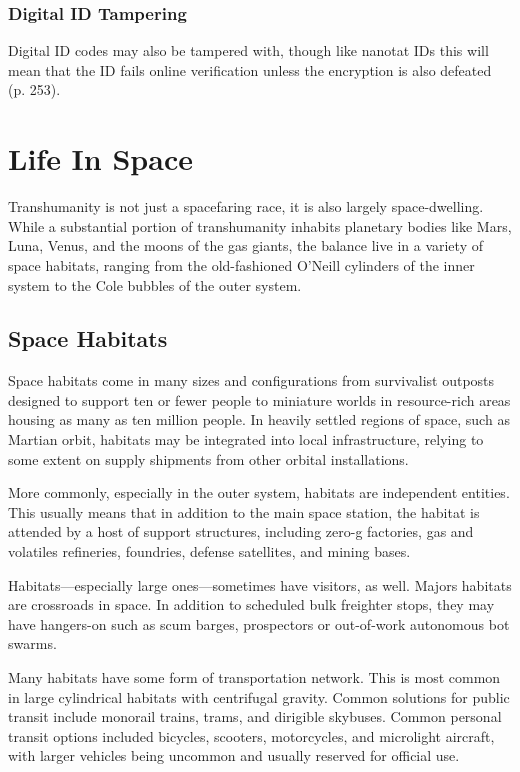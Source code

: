 \subsubsection{Digital ID Tampering}

Digital ID codes may also be tampered with, though like 
nanotat IDs this will mean that the ID fails online verification
unless the encryption is also defeated (p. 253).

\section{Life In Space}

Transhumanity is not just a spacefaring race, it is 
also largely space-dwelling. While a substantial portion
of transhumanity inhabits planetary bodies like
Mars, Luna, Venus, and the moons of the gas giants, 
the balance live in a variety of space habitats, ranging 
from the old-fashioned O'Neill cylinders of the inner 
system to the Cole bubbles of the outer system.

\subsection{Space Habitats}

Space habitats come in many sizes and configurations
from survivalist outposts designed to support
ten or fewer people to miniature worlds in resource-rich
areas housing as many as ten million people. In
heavily settled regions of space, such as Martian orbit, 
habitats may be integrated into local infrastructure, 
relying to some extent on supply shipments from other 
orbital installations.

More commonly, especially in the outer system, 
habitats are independent entities. This usually means 
that in addition to the main space station, the habitat 
is attended by a host of support structures, including 
zero-g factories, gas and volatiles refineries, foundries, 
defense satellites, and mining bases.

Habitats—especially large ones—sometimes have 
visitors, as well. Majors habitats are crossroads in 
space. In addition to scheduled bulk freighter stops, 
they may have hangers-on such as scum barges, prospectors
or out-of-work autonomous bot swarms.

Many habitats have some form of transportation 
network. This is most common in large cylindrical 
habitats with centrifugal gravity. Common solutions 
for public transit include monorail trains, trams, and 
dirigible skybuses. Common personal transit options 
included bicycles, scooters, motorcycles, and microlight
aircraft, with larger vehicles being uncommon
and usually reserved for official use.

